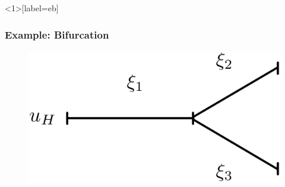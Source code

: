 \documentclass[compress]{beamer}
\begin{document}
\begin{frame}<1>[label=eb]
	\frametitle{Example: Bifurcation}
	\begin{figure}
		\begin{center}
			\begin{minipage}[t][0.35\paperheight][t]{\textwidth}
				\begin{minipage}{0.44\textwidth}
					\includegraphics[width=\textwidth]{images/bifurcation_1D.eps}
				\end{minipage}
\end{minipage}
\end{center}
\end{figure}
\end{frame}
\end{document}
